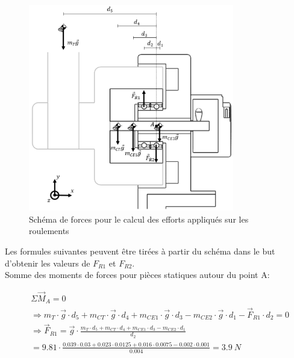 \begin{figure}[H]
    \centering
    \includegraphics[width = 0.8\textwidth]{assets/figures/CalculRoulements.svg}
    \caption{Schéma de forces pour le calcul des efforts appliqués sur les roulements}
    \label{fig:CalcRoul}
\end{figure}

Les formules suivantes peuvent être tirées à partir du schéma dans le but d'obtenir les valeurs de $F_{R1}$ et $F_{R2}$.\\
Somme des moments de forces pour pièces statiques autour du point A:

\begin{equation}
    \begin{aligned}
         & \Sigma \vec{M}_A = 0                                                                                                                                                       \\
         & \Rightarrow  m_T \cdot \vec{g} \cdot d_5 + m_{CT} \cdot \vec{g} \cdot d_4 + m_{CE1} \cdot \vec{g} \cdot d_3 - m_{CE2} \cdot \vec{g} \cdot d_1 - \vec{F}_{R1} \cdot d_2 = 0 \\
         & \Rightarrow  \vec{F}_{R1} = \vec{g} \cdot \frac{m_T \cdot d_5 + m_{CT} \cdot d_4 + m_{CE1} \cdot d_3 - m_{CE2} \cdot d_1}{d_2}                                             \\
         & = 9.81 \cdot \frac{0.039 \cdot 0.03 + 0.023 \cdot 0.0125 + 0.016 \cdot 0.0075 - 0.002 \cdot 0.001}{0.004} = 3.9~N
    \end{aligned}
\end{equation}

